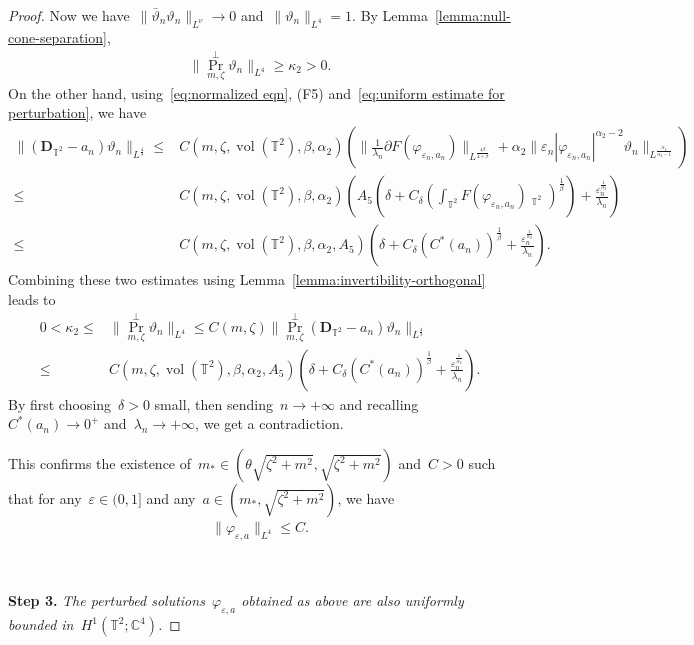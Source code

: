 \documentclass[10pt,a4paper]{amsart}
\newcommand{\p}{\partial}
\newcommand{\C}{\mathbb{C}}
\newcommand{\T}{\mathbb{T}}
\newcommand{\dd}{\mathop{}\!\mathrm{d}}
\newcommand{\eps}{\varepsilon}
\newcommand{\pD}{\mathbf{D}}
\newcommand{\parenthesis}[1]{\left(#1\right)} %
\DeclareMathOperator{\dv}{\dd{vol}}
\DeclareMathOperator{\proj}{Pr}
\DeclareMathOperator{\vol}{vol}
\begin{document}
\begin{proof}
Now we have~$\|\bar{\vartheta}_n\vartheta_n\|_{L^\nu}\to 0$ and~$\|\vartheta_n\|_{L^4}=1$. 
By Lemma~\ref{lemma:null-cone-separation},
\begin{align}
    \|\proj_{m,\zeta}^\perp\vartheta_n\|_{L^4}\geq \kappa_2>0. 
\end{align}
On the other hand, using~\eqref{eq:normalized eqn}, (F5) and~\eqref{eq:uniform estimate for perturbation}, we have  
\begin{align}
    \| (\pD_{\T^2}-a_n)\vartheta_n\|_{L^{\frac{4}{3}}} 
    \leq& C(m,\zeta,\vol(\mathbb{T}^2),\beta,\alpha_2)\parenthesis{ \|\frac{1}{\lambda_n}\p F(\varphi_{\eps_n,a_n})\|_{L^{\frac{4\beta}{4+\beta}} } + \alpha_2\|\eps_n|\varphi_{\eps_n,a_n}|^{\alpha_2-2}\vartheta_n \|_{L^{\frac{\alpha_2}{\alpha_2-1}} } } \\
    \leq & C(m,\zeta,\vol(\mathbb{T}^2),\beta,\alpha_2)
    \parenthesis{ A_5\parenthesis{\delta+ C_\delta \parenthesis{ \int_{\mathbb{T}^2} F(\varphi_{\eps_n,a_n})\dv_{\T^2}}^{\frac{1}{\beta}} } + \frac{\eps_n^{\frac{1}{\alpha_2}}}{\lambda_n} } \\
    \leq &  C(m,\zeta,\vol(\mathbb{T}^2),\beta,\alpha_2, A_5)
    \parenthesis{ \delta + C_\delta (C^*(a_n))^{\frac{1}{\beta} } + \frac{\eps_n^{\frac{1}{\alpha_2}}}{\lambda_n} }.
\end{align}
Combining these two estimates using Lemma~\ref{lemma:invertibility-orthogonal} leads to 
\begin{align}
   0<\kappa_2\leq & \|\proj_{m,\zeta}^\perp \vartheta_n\|_{L^4}
    \leq C(m,\zeta) \|\proj_{m,\zeta}^\perp (\pD_{\T^2}-a_n)\vartheta_n\|_{L^{\frac{4}{3}}}  \\
    \leq & C(m,\zeta,\vol(\mathbb{T}^2),\beta,\alpha_2, A_5)
    \parenthesis{ \delta + C_\delta (C^*(a_n))^{\frac{1}{\beta} } + \frac{\eps_n^{\frac{1}{\alpha_2}}}{\lambda_n} }.
\end{align}
By first choosing~$\delta>0$ small, then sending~$n\to+\infty$ and recalling~$C^*(a_n)\to 0^+$ and~$\lambda_n\to+\infty$, we get a contradiction. 

This confirms the existence of~$m_*\in (\theta\sqrt{\zeta^2+m^2},\sqrt{\zeta^2+m^2})$ and~$C>0$ such that for any~$\eps\in (0,1]$ and any~$a\in (m_*,\sqrt{\zeta^2+m^2})$, we have 
\begin{align}
    \|\varphi_{\eps,a}\|_{L^4}\leq C. 
\end{align} 

\ 

\noindent\textbf{Step 3.} \emph{The perturbed solutions~$\varphi_{\eps,a}$ obtained as above are also uniformly bounded in~$H^1(\T^2;\C^4)$.}


\end{proof}
\end{document}
